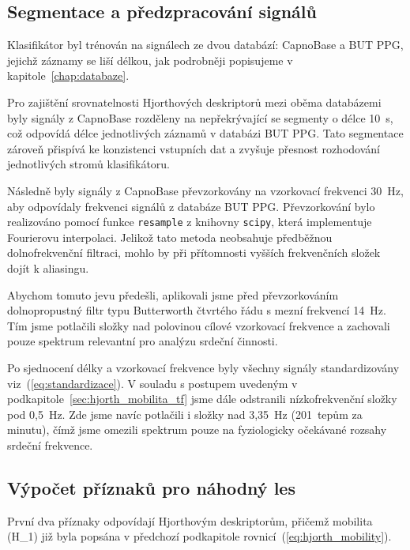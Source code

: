 \subsection*{Segmentace a předzpracování signálů}
\label{subsec:segmentace_predzpracovani}
Klasifikátor byl trénován na signálech ze dvou databází: CapnoBase a \acs{BUT PPG}, jejichž záznamy se liší délkou, jak podrobněji popisujeme v kapitole~\ref{chap:databaze}.

Pro zajištění srovnatelnosti Hjorthových deskriptorů mezi oběma databázemi byly signály z CapnoBase rozděleny na nepřekrývající se segmenty o délce 10~s, což odpovídá délce jednotlivých záznamů v databázi \acs{BUT PPG}.
Tato segmentace zároveň přispívá ke konzistenci vstupních dat a zvyšuje přesnost rozhodování jednotlivých stromů klasifikátoru.

Následně byly signály z CapnoBase převzorkovány na vzorkovací frekvenci 30~Hz, aby odpovídaly frekvenci signálů z databáze \acs{BUT PPG}.
Převzorkování bylo realizováno pomocí funkce \texttt{resample} z knihovny \texttt{scipy}, která implementuje Fourierovu interpolaci.
Jelikož tato metoda neobsahuje předběžnou dolnofrekvenční filtraci, mohlo by při přítomnosti vyšších frekvenčních složek dojít k aliasingu.

Abychom tomuto jevu předešli, aplikovali jsme před převzorkováním dolnopropustný filtr typu Butterworth čtvrtého řádu s mezní frekvencí 14~Hz.
Tím jsme potlačili složky nad polovinou cílové vzorkovací frekvence a zachovali pouze spektrum relevantní pro analýzu srdeční činnosti.

Po sjednocení délky a vzorkovací frekvence byly všechny signály standardizovány viz~(\ref{eq:standardizace}).
V souladu s postupem uvedeným v podkapitole~\ref{sec:hjorth_mobilita_tf} jsme dále odstranili nízkofrekvenční složky pod 0,5~Hz.
Zde jsme navíc potlačili i složky nad 3,35~Hz (201~tepům za minutu), čímž jsme omezili spektrum pouze na fyziologicky očekávané rozsahy srdeční frekvence.

\subsection*{Výpočet příznaků pro náhodný les}
\label{subsec:rf_features}
První dva příznaky odpovídají Hjorthovým deskriptorům, přičemž mobilita (\acs{H_1}) již byla popsána v předchozí podkapitole rovnicí~(\ref{eq:hjorth_mobility}).

